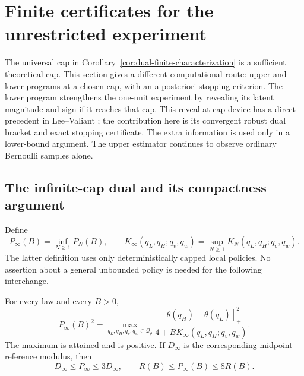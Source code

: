 \section{Finite certificates for the unrestricted experiment}
\label{sec:genie}

The universal cap in Corollary~\ref{cor:dual-finite-characterization} is a
sufficient theoretical cap. This section gives a different computational
route: upper and lower programs at a chosen cap, with an a posteriori
stopping criterion. The lower program strengthens the one-unit experiment
by revealing its latent magnitude and sign if it reaches that cap.
This reveal-at-cap device has a direct precedent in Lee--Valiant
\cite[Section 5.2]{leevaliant}; the contribution here is its convergent robust
dual bracket and exact stopping certificate. The extra information is
used only in a lower-bound argument. The upper
estimator continues to observe ordinary Bernoulli samples alone.

\subsection{The infinite-cap dual and its compactness argument}

Define
\[
 P_\infty(B)=\inf_{N\ge1}P_N(B),\qquad
 K_\infty(q_L,q_H;q_v,q_w)=\sup_{N\ge1}K_N(q_L,q_H;q_v,q_w).
\]
The latter definition uses only deterministically capped local policies.
No assertion about a general unbounded policy is needed for the following
interchange.

\begin{lemma}\label{lem:infinite-dual}
For every law and every $B>0$,
\begin{equation}\label{eq:infinite-dual}
 P_\infty(B)^2
 =\max_{q_L,q_H,q_v,q_w\in\mathcal Q_\rho}
 \frac{[\theta(q_H)-\theta(q_L)]_+^2}{4+B K_\infty(q_L,q_H;q_v,q_w)}.
\end{equation}
The maximum is attained and is positive. If $D_\infty$ is the corresponding
midpoint-reference modulus, then
\begin{equation}\label{eq:infinite-comparison}
 D_\infty\le P_\infty\le3D_\infty,
 \qquad R(B)\le P_\infty(B)\le8R(B).
\end{equation}
\end{lemma}

